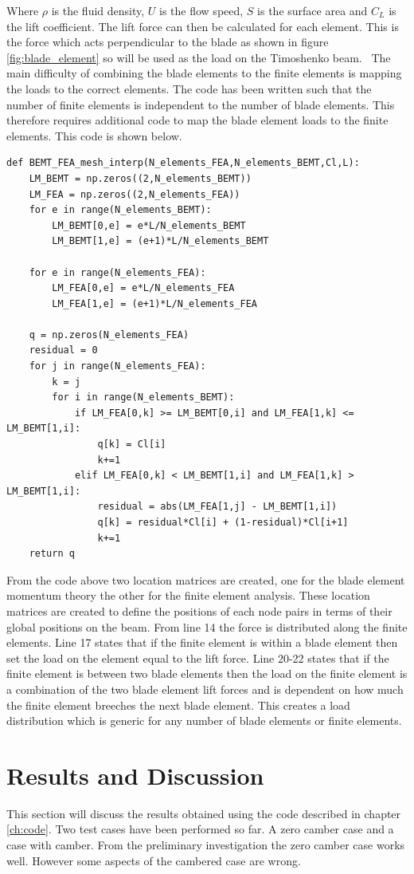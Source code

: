 \documentclass[]{report}
\begin{document}
Where $\rho$ is the fluid density, $U$ is the flow speed, $S$ is the surface area and $C_L$ is the lift coefficient. The lift force can then be calculated for each element. This is the force which acts perpendicular to the blade as shown in figure \ref{fig:blade_element} so will be used as the load on the Timoshenko beam. 
\
The main difficulty of combining the blade elements to the finite elements is mapping the loads to the correct elements. The code has been written such that the number of finite elements is independent to the number of blade elements. This therefore requires additional code to map the blade element loads to the finite elements. This code is shown below.

\begin{lstlisting}
def BEMT_FEA_mesh_interp(N_elements_FEA,N_elements_BEMT,Cl,L):
	LM_BEMT = np.zeros((2,N_elements_BEMT))
	LM_FEA = np.zeros((2,N_elements_FEA))
	for e in range(N_elements_BEMT):
		LM_BEMT[0,e] = e*L/N_elements_BEMT
		LM_BEMT[1,e] = (e+1)*L/N_elements_BEMT
	
	for e in range(N_elements_FEA):
		LM_FEA[0,e] = e*L/N_elements_FEA
		LM_FEA[1,e] = (e+1)*L/N_elements_FEA
	
	q = np.zeros(N_elements_FEA)
	residual = 0
	for j in range(N_elements_FEA):   
		k = j 
		for i in range(N_elements_BEMT):
			if LM_FEA[0,k] >= LM_BEMT[0,i] and LM_FEA[1,k] <= LM_BEMT[1,i]:
				q[k] = Cl[i]
				k+=1
			elif LM_FEA[0,k] < LM_BEMT[1,i] and LM_FEA[1,k] > LM_BEMT[1,i]:
				residual = abs(LM_FEA[1,j] - LM_BEMT[1,i])
				q[k] = residual*Cl[i] + (1-residual)*Cl[i+1]
				k+=1
	return q
\end{lstlisting}

From the code above two location matrices are created, one for the blade element momentum theory the other for the finite element analysis. These location matrices are created to define the positions of each node pairs in terms of their global positions on the beam. From line 14 the force is distributed along the finite elements. Line 17 states that if the finite element is within a blade element then set the load on the element equal to the lift force. Line 20-22 states that if the finite element is between two blade elements then the load on the finite element is a combination of the two blade element lift forces and is dependent on how much the finite element breeches the next blade element. This creates a load distribution which is generic for any number of blade elements or finite elements.

\chapter{Results and Discussion}
\label{ch:Results and Discussion}
This section will discuss the results obtained using the code described in chapter \ref{ch:code}. Two test cases have been performed so far. A zero camber case and a  case with camber. From the preliminary investigation the zero camber case works well. However some aspects of the cambered case are wrong.
\end{document}
